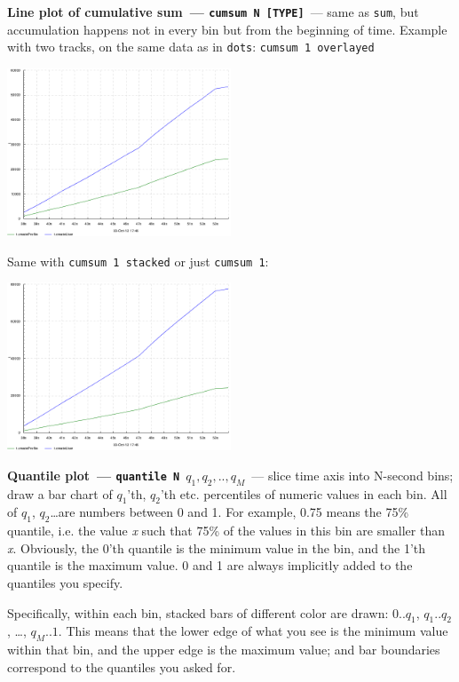 \documentclass{article}
\begin{document}
\pagebreak
\noindent
\textbf{Line plot of cumulative sum~--- \texttt{cumsum N [TYPE]}}~--- same as \texttt{sum}, but accumulation happens not in every bin but from the beginning of time.
Example with two tracks, on the same data as in \texttt{dots}: \texttt{cumsum 1 overlayed}

{\centering \includegraphics[width=0.5\textwidth]{pics/tplot/cumsum-create-user-and-profile-overlayed.png}}

Same with \texttt{cumsum 1 stacked} or just \texttt{cumsum 1}:

{\centering \includegraphics[width=0.5\textwidth]{pics/tplot/cumsum-create-user-and-profile-stacked.png}}

\pagebreak
\noindent
\textbf{Quantile plot~--- \texttt{quantile N $q_1,q_2,..,q_M$}}~--- slice time axis into N-second bins; draw a bar chart of $q_1$'th, $q_2$'th etc. percentiles of numeric values in each bin. All of $q_1$, $q_2$\ldots are numbers between 0 and 1. For example, 0.75 means the 75\% quantile, i.e. the value \emph{x} such that 75\% of the values in this bin are smaller than \emph{x}. Obviously, the 0'th quantile is the minimum value in the bin, and the 1'th quantile is the maximum value. 0 and 1 are always implicitly added to the quantiles you specify.

Specifically, within each bin, stacked bars of different color are drawn: $0..q_1$, $q_1..q_2$, \ldots, $q_M..1$. This means that the lower edge of what you see is the minimum value within that bin, and the upper edge is the maximum value; and bar boundaries correspond to the quantiles you asked for.
\end{document}
